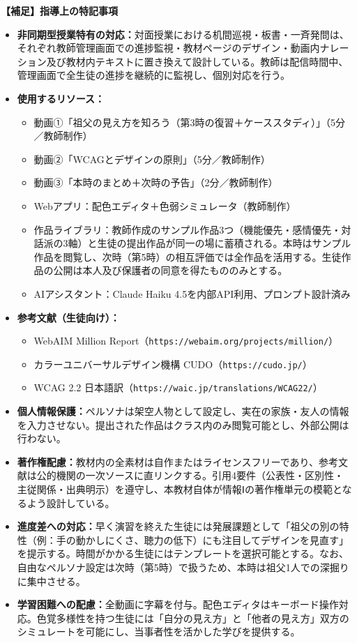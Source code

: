 \documentclass[uplatex,a4paper,11pt]{jsarticle}
\begin{document}
\bigskip

\noindent\textbf{【補足】指導上の特記事項}

\begin{itemize}[leftmargin=2em,itemsep=2pt,topsep=2pt]
  \item \textbf{非同期型授業特有の対応：}対面授業における机間巡視・板書・一斉発問は、それぞれ教師管理画面での進捗監視・教材ページのデザイン・動画内ナレーション及び教材内テキストに置き換えて設計している。教師は配信時間中、管理画面で全生徒の進捗を継続的に監視し、個別対応を行う。
  \item \textbf{使用するリソース：}
    \begin{itemize}[leftmargin=1em,topsep=0pt,itemsep=0pt]
      \item 動画①「祖父の見え方を知ろう（第3時の復習＋ケーススタディ）」（5分／教師制作）
      \item 動画②「WCAGとデザインの原則」（5分／教師制作）
      \item 動画③「本時のまとめ＋次時の予告」（2分／教師制作）
      \item Webアプリ：配色エディタ＋色弱シミュレータ（教師制作）
      \item 作品ライブラリ：教師作成のサンプル作品3つ（機能優先・感情優先・対話派の3軸）と生徒の提出作品が同一の場に蓄積される。本時はサンプル作品を閲覧し、次時（第5時）の相互評価では全作品を活用する。生徒作品の公開は本人及び保護者の同意を得たもののみとする。
      \item AIアシスタント：Claude Haiku 4.5を内部API利用、プロンプト設計済み
    \end{itemize}
  \item \textbf{参考文献（生徒向け）：}
    \begin{itemize}[leftmargin=1em,topsep=0pt,itemsep=0pt]
      \item WebAIM Million Report（\texttt{https://webaim.org/projects/million/}）
      \item カラーユニバーサルデザイン機構 CUDO（\texttt{https://cudo.jp/}）
      \item WCAG 2.2 日本語訳（\texttt{https://waic.jp/translations/WCAG22/}）
    \end{itemize}
  \item \textbf{個人情報保護：}ペルソナは架空人物として設定し、実在の家族・友人の情報を入力させない。提出された作品はクラス内のみ閲覧可能とし、外部公開は行わない。
  \item \textbf{著作権配慮：}教材内の全素材は自作またはライセンスフリーであり、参考文献は公的機関の一次ソースに直リンクする。引用4要件（公表性・区別性・主従関係・出典明示）を遵守し、本教材自体が情報Ⅰの著作権単元の模範となるよう設計している。
  \item \textbf{進度差への対応：}早く演習を終えた生徒には発展課題として「祖父の別の特性（例：手の動かしにくさ、聴力の低下）にも注目してデザインを見直す」を提示する。時間がかかる生徒にはテンプレートを選択可能とする。なお、自由なペルソナ設定は次時（第5時）で扱うため、本時は祖父1人での深掘りに集中させる。
  \item \textbf{学習困難への配慮：}全動画に字幕を付与。配色エディタはキーボード操作対応。色覚多様性を持つ生徒には「自分の見え方」と「他者の見え方」双方のシミュレートを可能にし、当事者性を活かした学びを提供する。
\end{itemize}
\end{document}

